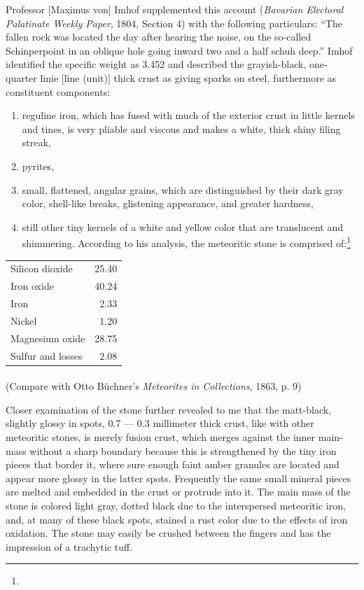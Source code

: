 \documentclass[a4paper, 12pt, oneside]{article}
\begin{document}
Professor [Maximus von] Imhof supplemented this account (\emph{Bavarian Electoral Palatinate Weekly Paper}, 1804, Section 4) with the following particulars: ``The fallen rock was located the day after hearing the noise, on the so-called Schinperpoint in an oblique hole going inward two and a half schuh deep.'' Imhof identified the specific weight as 3.452 and described the grayish-black, one-quarter linie [line (unit)] thick crust as giving sparks on steel, furthermore as constituent components:
\begin{enumerate}
    \item reguline iron, which has fused with much of the exterior crust in little kernels and tines, is very pliable and viscous and makes a white, thick shiny filing streak,
    \item pyrites,
    \item small, flattened, angular grains, which are distinguished by their dark gray color, shell-like breaks, glistening appearance, and greater hardness,
    \item still other tiny kernels of a white and yellow color that are translucent and shimmering. According to his analysis, the meteoritic stone is comprised of:\footnote{}
\end{enumerate}
\begin{center}
    \begin{tabular}{l r} 
    Silicon dioxide & 25.40\\
    Iron oxide & 40.24\\
    Iron & 2.33\\
    Nickel & 1.20\\
    Magnesium oxide & 28.75\\
    Sulfur and losses & 2.08\\
    \end{tabular}
\end{center}
\paragraph*{}
(Compare with Otto Büchner's \emph{Meteorites in Collections}, 1863, p. 9)

Closer examination of the stone further revealed to me that the matt-black, slightly glossy in spots, 0.7 --- 0.3 millimeter thick crust, like with other meteoritic stones, is merely fusion crust, which merges against the inner main-mass without a sharp boundary because this is strengthened by the tiny iron pieces that border it, where sure enough faint amber granules are located and appear more glossy in the latter spots. Frequently the same small mineral pieces are melted and embedded in the crust or protrude into it. The main mass of the stone is colored light gray, dotted black due to the interspersed meteoritic iron, and, at many of these black spots, stained a rust color due to the effects of iron oxidation. The stone may easily be crushed between the fingers and has the impression of a trachytic tuff.
\end{document}
